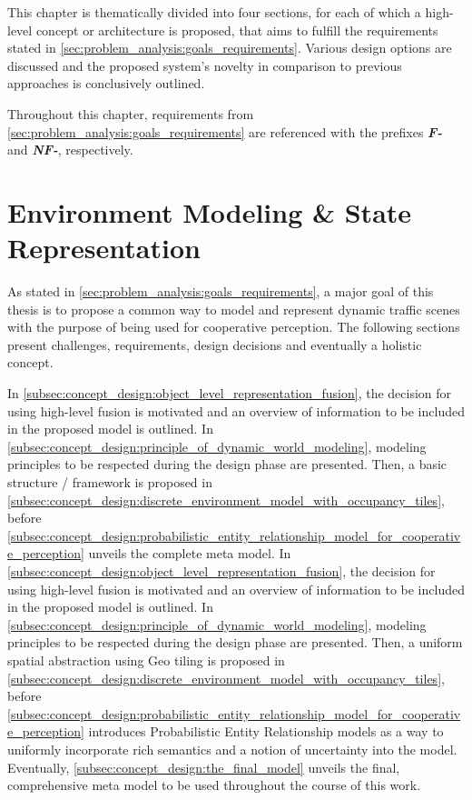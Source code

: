This chapter is thematically divided into four sections, for each of which a high-level concept or architecture is proposed, that aims to fulfill the requirements stated in \cref{sec:problem_analysis:goals_requirements}. Various design options are discussed and the proposed system's novelty in comparison to previous approaches is conclusively outlined.

Throughout this chapter, requirements from \cref{sec:problem_analysis:goals_requirements} are referenced with the prefixes \textit{\textbf{F-}} and \textit{\textbf{NF-}}, respectively.

\section{Environment Modeling \& State Representation}
\label{sec:concept_design:environment_modeling_state_representation}
As stated in \cref{sec:problem_analysis:goals_requirements}, a major goal of this thesis is to propose a common way to model and represent dynamic traffic scenes with the purpose of being used for cooperative perception. The following sections present challenges, requirements, design decisions and eventually a holistic concept.

In \cref{subsec:concept_design:object_level_representation_fusion}, the decision for using high-level fusion is motivated and an overview of information to be included in the proposed model is outlined. In \cref{subsec:concept_design:principle_of_dynamic_world_modeling}, modeling principles to be respected during the design phase are presented. Then, a basic structure / framework is proposed in \cref{subsec:concept_design:discrete_environment_model_with_occupancy_tiles}, before \cref{subsec:concept_design:probabilistic_entity_relationship_model_for_cooperative_perception} unveils the complete meta model. 
In \cref{subsec:concept_design:object_level_representation_fusion}, the decision for using high-level fusion is motivated and an overview of information to be included in the proposed model is outlined. In \cref{subsec:concept_design:principle_of_dynamic_world_modeling}, modeling principles to be respected during the design phase are presented. Then, a uniform spatial abstraction using Geo tiling is proposed in \cref{subsec:concept_design:discrete_environment_model_with_occupancy_tiles}, before \cref{subsec:concept_design:probabilistic_entity_relationship_model_for_cooperative_perception} introduces Probabilistic Entity Relationship models as a way to uniformly incorporate rich semantics and a notion of uncertainty into the model. Eventually, \cref{subsec:concept_design:the_final_model} unveils the final, comprehensive meta model to be used throughout the course of this work.

